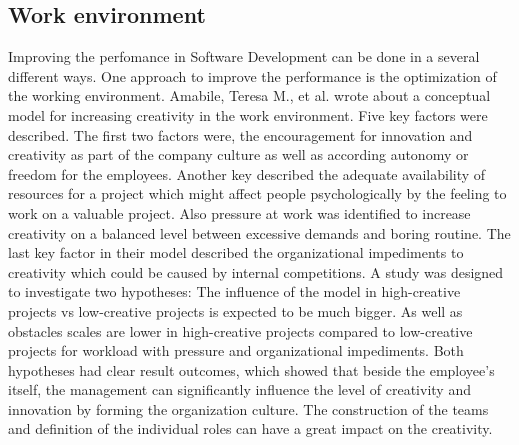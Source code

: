 \subsection{Work environment}
Improving the perfomance in Software Development can be done in a several different ways. One approach to improve the performance is the optimization of the working environment. Amabile, Teresa M., et al. \cite{amabile1996assessing} wrote about a conceptual model for increasing creativity in the work environment. Five key factors were described. The first two factors were, the encouragement for innovation and creativity as part of the company culture as well as according autonomy or freedom for the employees. Another key described the adequate availability of resources for a project which might affect people psychologically by the feeling to work on a valuable project. Also pressure at work was identified to increase creativity on a balanced level between excessive demands and boring routine. The last key factor in their model described the organizational impediments to creativity which could be caused by internal competitions.
A study was designed to investigate two hypotheses: The influence of the model in high-creative projects vs low-creative projects is expected to be much bigger. As well as obstacles scales are lower in high-creative projects compared to low-creative projects for workload with pressure and organizational impediments.
Both hypotheses had clear result outcomes, which showed that beside the employee's itself, the management can significantly influence the level of creativity and innovation by forming the organization culture. The construction of the teams and definition of the individual roles can have a great impact on the creativity. 

